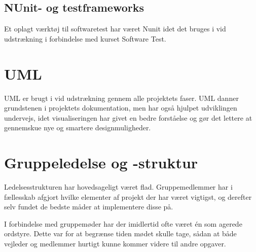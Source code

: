 \subsection{NUnit- og testframeworks}
Et oplagt værktøj til softwaretest har været Nunit idet det bruges i vid udstrækning i forbindelse med kurset Software Test.

\section{UML}
UML er brugt i vid udstrækning gennem alle projektets faser. UML danner grundstenen i projektets dokumentation, men har også hjulpet udviklingen undervejs, idet visualiseringen har givet en bedre forståelse og gør det lettere at gennemskue nye og smartere designmuligheder.

\section{Gruppeledelse og -struktur}
Ledelsesstrukturen har hovedsageligt været flad. Gruppemedlemmer har i fællesskab afgjort hvilke elementer af projekt der har været vigtigst, og derefter selv fundet de bedste måder at implementere disse på.

I forbindelse med gruppemøder har der imidlertid ofte været én som agerede ordstyre. Dette var for at begrænse tiden mødet skulle tage, sådan at både vejleder og medlemmer hurtigt kunne kommer videre til andre opgaver.